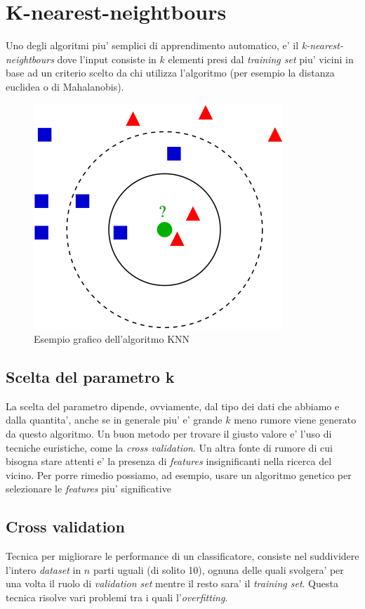 \section*{K-nearest-neightbours}
Uno degli algoritmi piu' semplici di apprendimento automatico, e' il \textit{k-nearest-neightbours} dove l'input consiste in $k$ elementi presi dal \textit{training set} piu' vicini in base ad un criterio scelto da chi utilizza l'algoritmo (per esempio la distanza euclidea o di Mahalanobis).


\begin{figure}[H]
	\centering
	\includegraphics[width=0.7\linewidth]{img/knn_example}
	\caption{Esempio grafico dell'algoritmo KNN}
	\label{fig:knnexample}
\end{figure}


\subsection*{Scelta del parametro k}
La scelta del parametro dipende, ovviamente, dal tipo dei dati che abbiamo e dalla quantita', anche se in generale piu' e' grande $k$ meno rumore viene generato da questo algoritmo. Un buon metodo per trovare il giusto valore e' l'uso di tecniche euristiche, come la \textit{cross validation}. Un altra fonte di rumore di cui bisogna stare attenti e' la presenza di \textit{features} insignificanti nella ricerca del vicino. Per porre rimedio possiamo, ad esempio, usare un algoritmo genetico per selezionare le \textit{features} piu' significative

\subsection*{Cross validation}
Tecnica per migliorare le performance di un classificatore, consiste nel suddividere l'intero \textit{dataset} in $n$ parti uguali (di solito 10), ognuna delle quali svolgera' per una volta il ruolo di \textit{validation set} mentre il resto sara' il \textit{training set}. Questa tecnica risolve vari problemi tra i quali l'\textit{overfitting}.\\

